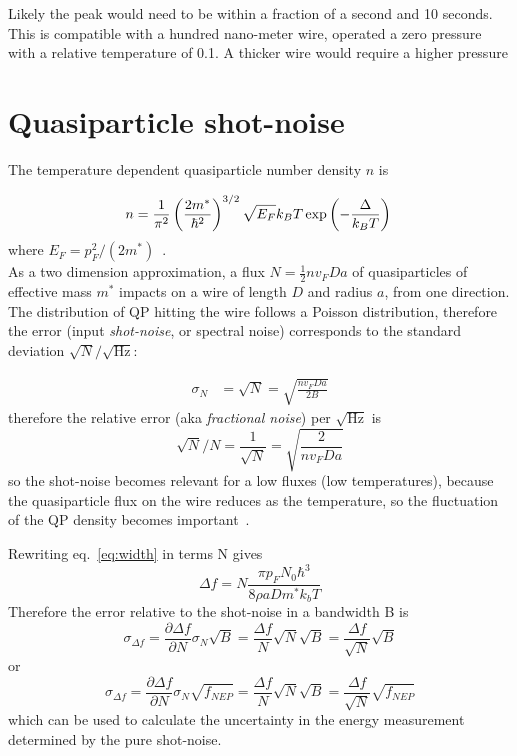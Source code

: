 \documentclass[a4paper,12pt]{article}
\begin{document}
Likely the peak would need to be within a fraction of a second and 10 seconds.
This is compatible with a hundred nano-meter wire, operated a zero pressure with a relative temperature of 0.1. A thicker wire would require a higher pressure



\section{Quasiparticle shot-noise}

The temperature dependent quasiparticle number density $n$ is

\begin{equation}
n = \frac{1}{\pi^2} \left( \frac{2m^*}{\hbar^2} \right) ^{3/2} \sqrt{E_F} k_B T \exp \left( {-\frac{\Delta}{k_BT}} \right) \\
\end{equation}
where $E_F = p_F^2/(2m^*)$~\cite{vonka}.\\
As a two dimension approximation, a flux $N=\frac{1}{2}nv_FDa$ of quasiparticles of effective mass $m^*$ impacts on a wire of length $D$ and radius $a$, from one direction.\\
The distribution of QP hitting the wire follows a Poisson distribution, therefore the error (input \textit{shot-noise}, or spectral noise) corresponds to the standard deviation $\sqrt{N}/\sqrt{\mathrm{Hz}}$:

\begin{align}
\sigma_N &= \sqrt{N} = \sqrt{\frac{nv_FDa}{2B}}
\end{align}
therefore the relative error (aka \textit{fractional noise}) per $\sqrt{\mathrm{Hz}}$ is
\begin{equation}
  \sqrt{N}/N = \frac{1}{\sqrt{N}} = \sqrt{\frac{2}{n v_F D a}}
\end{equation}
so the shot-noise becomes relevant for a low fluxes (low temperatures), because the quasiparticle flux on the wire reduces as the temperature, so the fluctuation of the QP density becomes important~\cite{bradley}.

Rewriting eq.~\ref{eq:width} in terms N gives
\begin{equation}
  \Delta f = N \frac{\pi p_F N_0 \hbar^3}{8 \rho a D m^* k_b T}
\end{equation}
Therefore the error relative to the shot-noise in a bandwidth B is
\begin{equation}
  \sigma_{\Delta f} = \frac{\partial \Delta f}{\partial N} \sigma_N \sqrt{B} = \frac{\Delta f}{N}\sqrt{N} \sqrt{B} = \frac{\Delta f}{\sqrt{N}} \sqrt{B}
\end{equation}
or
\begin{equation}
  \sigma_{\Delta f} = \frac{\partial \Delta f}{\partial N} \sigma_N \sqrt{f_{NEP}} = \frac{\Delta f}{N}\sqrt{N} \sqrt{B} = \frac{\Delta f}{\sqrt{N}} \sqrt{f_{NEP}}
\end{equation}
which can be used to calculate the uncertainty in the energy measurement determined by the pure shot-noise.
\end{document}
